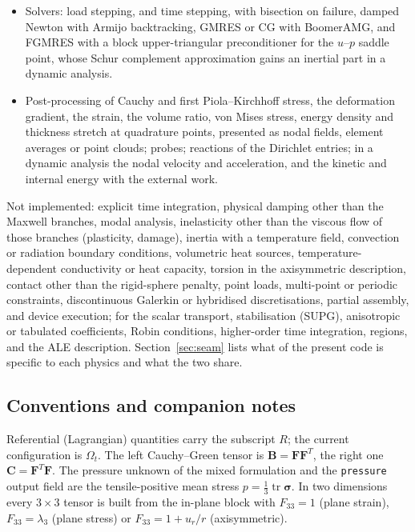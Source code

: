\documentclass[11pt]{article}
\newcommand{\tr}{\operatorname{tr}}
\newcommand{\bsig}{\bm{\sigma}}
\newcommand{\bF}{\bm{F}}
\newcommand{\bC}{\bm{C}}
\newcommand{\bB}{\bm{B}}
\DeclareRobustCommand{\code}[1]{{\def\_{\textunderscore\allowbreak}\texttt{#1}}}
\begin{document}
\begin{itemize}[nosep]
  \item Solvers: load stepping, and time stepping, with bisection on
    failure, damped Newton with Armijo backtracking, GMRES or CG with
    BoomerAMG, and FGMRES with a block upper-triangular preconditioner for
    the $u$--$p$ saddle point, whose Schur complement approximation gains an
    inertial part in a dynamic analysis.
  \item Post-processing of Cauchy and first Piola--Kirchhoff stress, the
    deformation gradient, the strain, the volume ratio, von Mises stress, energy density
    and thickness stretch at quadrature points, presented as nodal fields,
    element averages or point clouds; probes; reactions of the Dirichlet
    entries; in a dynamic analysis the nodal velocity and acceleration, and
    the kinetic and internal energy with the external work.
\end{itemize}

Not implemented: explicit time integration, physical damping other than
the Maxwell branches, modal analysis, inelasticity other than the viscous
flow of those branches (plasticity, damage), inertia with a temperature
field, convection or radiation boundary conditions, volumetric heat
sources, temperature-dependent conductivity or heat capacity, torsion in
the axisymmetric description, contact other than the rigid-sphere penalty,
point loads, multi-point or periodic constraints, discontinuous Galerkin or
hybridised discretisations, partial assembly, and device execution; for the
scalar transport, stabilisation (SUPG), anisotropic or tabulated
coefficients, Robin conditions, higher-order time integration, regions, and
the ALE description.  Section~\ref{sec:seam} lists what of the present code
is specific to each physics and what the two share.

\subsection{Conventions and companion notes}

Referential (Lagrangian) quantities carry the subscript $R$; the current
configuration is $\Omega_t$.  The left Cauchy--Green tensor is $\bB = \bF\bF^T$,
the right one $\bC = \bF^T\bF$.  The pressure unknown of the mixed formulation
and the \code{pressure} output field are the tensile-positive mean stress
$p = \tfrac13\tr\bsig$.  In two dimensions every $3\times3$ tensor is built
from the in-plane block with $F_{33} = 1$ (plane strain), $F_{33} = \lambda_3$
(plane stress) or $F_{33} = 1 + u_r/r$ (axisymmetric).
\end{document}
